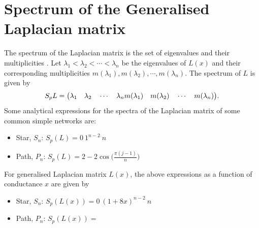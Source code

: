 \documentclass[10pt,a4paper]{article}
\begin{document}
\section{Spectrum of the Generalised Laplacian matrix}
The spectrum of the Laplacian matrix is the set of eigenvalues and their multiplicities \cite{estrada2011epidemic}. Let $\lambda_1 < \lambda_2 < \cdots < \lambda_n$ be the eigenvalues of $L(x)$ and their corresponding multiplicities $m(\lambda_1), m(\lambda_2), \cdots, m(\lambda_n)$. The spectrum of $L$ is given by
\begin{equation}
S_p L = \big(\lambda_1 \quad \lambda_2 \quad \cdots \quad \lambda_n \\
m(\lambda_1) \quad m(\lambda_2) \quad \cdots \quad m(\lambda_n)  \big).
\end{equation}
Some analytical expressions for the spectra of the Laplacian matrix of some common simple networks are:\\
\begin{itemize}
	\item Star, $S_n$: $S_p(L) = {0~ 1^{n-2}~ n}$\\
	\item Path, $P_n$: $S_p(L) = {2-2\cos\big( \frac{\pi(j-1)}{n}\big) }$
\end{itemize}
For generalised Laplacian matrix $L(x)$, the above expressions as a function of conductance $x$ are given by
\begin{itemize}
	\item Star, $S_n$: $S_p(L(x)) = {0~ (1+8x)^{n-2}~ n}$\\
	\item Path, $P_n$: $S_p(L(x)) = { }$
\end{itemize}
\end{document}
